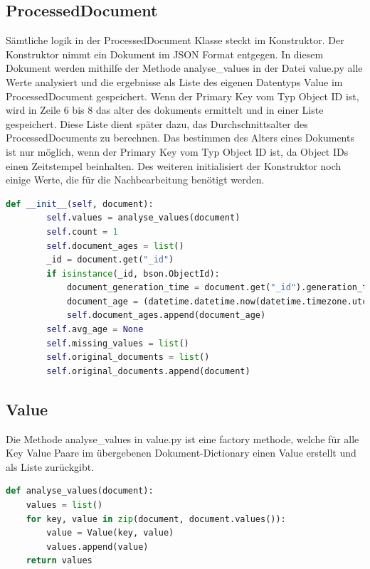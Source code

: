 \subsection{ProcessedDocument}
\label{sub:ba_processed_document}

Sämtliche logik in der ProcessedDocument Klasse steckt im Konstruktor.
Der Konstruktor nimmt ein Dokument im JSON Format entgegen.
In diesem Dokument werden mithilfe der Methode analyse\_values in der Datei value.py alle Werte analysiert und die ergebnisse als Liste des eigenen Datentyps Value im ProcessedDocument gespeichert.
Wenn der Primary Key vom Typ Object ID ist, wird in Zeile 6 bis 8 das alter des dokuments ermittelt und in einer Liste gespeichert.
Diese Liste dient später dazu, das Durchschnittsalter des ProcessedDocuments zu berechnen.
Das bestimmen des Alters eines Dokuments ist nur möglich, wenn der Primary Key vom Typ Object ID ist, da Object IDs einen Zeitstempel beinhalten.
Des weiteren initialisiert der Konstruktor noch einige Werte, die für die Nachbearbeitung benötigt werden.

\begin{lstlisting}[language=python, caption={ProcessedDocument.\_\_init\_\_},label={lst:backend_processed_document_init}]
    def __init__(self, document):
        self.values = analyse_values(document)
        self.count = 1
        self.document_ages = list()
        _id = document.get("_id")
        if isinstance(_id, bson.ObjectId):
            document_generation_time = document.get("_id").generation_time
            document_age = (datetime.datetime.now(datetime.timezone.utc) - document_generation_time).total_seconds()
            self.document_ages.append(document_age)
        self.avg_age = None
        self.missing_values = list()
        self.original_documents = list()
        self.original_documents.append(document)
\end{lstlisting}

\subsection{Value}
\label{sub:ba_value}

Die Methode analyse\_values in value.py ist eine factory methode, welche für alle Key Value Paare im übergebenen Dokument-Dictionary einen Value erstellt und als Liste zurückgibt.

\begin{lstlisting}[language=python, caption={Value.analyse\_values},label={lst:backend_value_analyse_values}]
def analyse_values(document):
    values = list()
    for key, value in zip(document, document.values()):
        value = Value(key, value)
        values.append(value)
    return values
\end{lstlisting}

